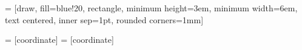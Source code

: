 \usepackage{tikz}
\usepackage{tikz-3dplot}
\usetikzlibrary{shapes}
\usetikzlibrary{arrows}
\usetikzlibrary{fit}
\usetikzlibrary{backgrounds}

 = [draw, fill=blue!20, rectangle,
    minimum height=3em, minimum width=6em, text centered, inner sep=1pt, rounded corners=1mm]

 = [coordinate]
 = [coordinate]
